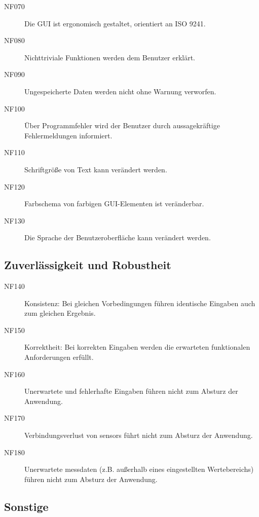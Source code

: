 \documentclass[parskip=full]{scrartcl}
\begin{document}
\begin{description}

\item[NF070] Die \gls{GUI} ist ergonomisch gestaltet, orientiert an ISO 9241.
\item[NF080] Nichttriviale Funktionen werden dem Benutzer erklärt.
\item[NF090] Ungespeicherte Daten werden nicht ohne Warnung verworfen.
\item[NF100] Über Programmfehler wird der Benutzer durch aussagekräftige Fehlermeldungen informiert.
\item[NF110] Schriftgröße von Text kann verändert werden.
\item[NF120] Farbschema von farbigen GUI-Elementen ist veränderbar.
\item[NF130] Die Sprache der Benutzeroberfläche kann verändert werden.

\end{description}

\subsection{Zuverlässigkeit und Robustheit}

\begin{description}

\item[NF140] Konsistenz: Bei gleichen Vorbedingungen führen identische Eingaben auch zum gleichen Ergebnis.
\item[NF150] Korrektheit: Bei korrekten Eingaben werden die erwarteten funktionalen Anforderungen erfüllt.
\item[NF160] Unerwartete und fehlerhafte Eingaben führen nicht zum Absturz der Anwendung.
\item[NF170] Verbindungsverlust von \glspl{sensor} führt nicht zum Absturz der Anwendung.
\item[NF180] Unerwartete \gls{messdaten} (z.B. außerhalb eines eingestellten Wertebereichs) führen nicht zum Absturz der Anwendung.

\end{description}

\subsection{Sonstige}
\end{document}

